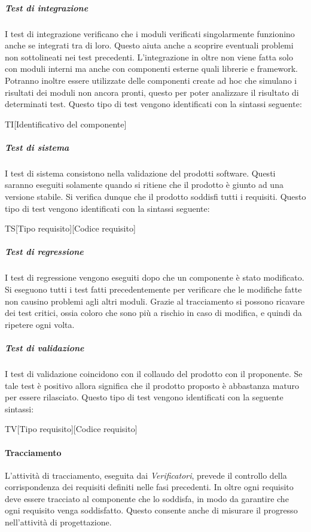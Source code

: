 				 \subparagraph{Test di integrazione}
				 I test di integrazione verificano che i moduli verificati singolarmente funzionino anche se integrati tra di loro. Questo aiuta anche a scoprire eventuali problemi non sottolineati nei test precedenti. L'integrazione in oltre non viene fatta solo con moduli interni ma anche con componenti esterne quali librerie e framework.\\
				 Potranno inoltre essere utilizzate delle componenti create ad hoc che simulano i risultati dei moduli non ancora pronti, questo per poter analizzare il risultato di determinati test. Questo tipo di test vengono identificati con la sintassi seguente:\\
				 \begin{center}
				 	TI[Identificativo del componente]
				 \end{center}

				 \subparagraph{Test di sistema}
				 I test di sistema consistono nella validazione del prodotti software. Questi saranno eseguiti solamente quando si ritiene che il prodotto è giunto ad una versione stabile. Si verifica dunque che il prodotto soddisfi tutti i requisiti. Questo tipo di test vengono identificati con la sintassi seguente: \\
				\begin{center}
				 	TS[Tipo requisito][Codice requisito]
				 \end{center}

				 \subparagraph{Test di regressione}
				 I test di regressione vengono eseguiti dopo che un componente è stato modificato. Si eseguono tutti i test fatti precedentemente per verificare che le modifiche fatte non causino problemi agli altri moduli. Grazie al tracciamento si possono ricavare dei test critici, ossia coloro che sono più a rischio in caso di modifica, e quindi da ripetere ogni volta.
				 \subparagraph{Test di validazione}
				 I test di validazione coincidono con il collaudo del prodotto con il proponente. Se tale test è positivo allora significa che il prodotto proposto è abbastanza maturo per essere rilasciato. Questo tipo di test vengono identificati con la seguente sintassi:\\
				 \begin{center}
				 	TV[Tipo requisito][Codice requisito]
				 \end{center}

			\paragraph{Tracciamento} %
			\label{par:tracciamento}
			L'attività di tracciamento, eseguita dai \emph{Verificatori}, prevede il controllo della corrispondenza dei requisiti definiti nelle fasi precedenti. In oltre ogni requisito deve essere tracciato al componente che lo soddisfa, in modo da garantire che ogni requisito venga soddisfatto. Questo consente anche di misurare il progresso nell'attività di progettazione.



